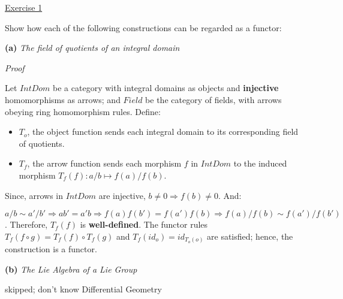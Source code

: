 \noindent
\underline{Exercise 1}
\vspace{2mm}

Show how each of the following constructions can be regarded as a functor:

\vspace{2mm}
\textbf{(a)} \emph{The field of quotients of an integral domain}
\vspace{2mm}

\noindent
\emph{Proof}

Let $IntDom$ be a category with integral domains as objects and \textbf{injective} homomorphisms as arrows; and $Field$ be the category of fields, with arrows obeying ring homomorphism rules. Define:

\begin{itemize}
    \item $T_o$, the object function sends each integral domain to its corresponding field of quotients. 
	\item $T_f$, the arrow function sends each morphism $f$ in $IntDom$ to the induced morphism $T_f(f) : a/b \longmapsto f(a) / f(b)$. 
\end{itemize}

Since, arrows in $IntDom$ are injective, $b \neq 0 \Longrightarrow f(b) \neq 0$. And:

$ a/b \sim a'/b' \Longrightarrow ab' = a'b \Longrightarrow f(a)f(b') = f(a')f(b) \Longrightarrow f(a)/f(b) \sim f(a')/f(b')$. Therefore, $T_f(f)$ is \textbf{well-defined}. The functor rules 
$T_f(f \circ g) = T_f(f) \circ T_f(g)$ and $T_f(id_o) = id_{T_o(o)}$ are satisfied; hence, the construction is a functor. 

\vspace{2mm}

\textbf{(b)} \emph{The Lie Algebra of a Lie Group}

skipped; don't know Differential Geometry

\vspace{2mm}
